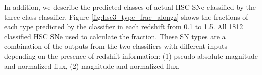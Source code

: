 \documentclass[proof]{pasj01}
\providecommand{\DIFadd}[1]{{\protect\color{blue} \sf #1}} %
\providecommand{\DIFdel}[1]{{\protect\color{red} \scriptsize #1}} %
\providecommand{\DIFaddbegin}{\protect\color{blue}} %
\providecommand{\DIFaddend}{\protect\color{black}} %
\providecommand{\DIFdelbegin}{\protect\color{red}} %
\providecommand{\DIFdelend}{\protect\color{black}} %
\providecommand{\DIFaddbeginFL}{} %
\providecommand{\DIFdelbeginFL}{} %
\providecommand{\DIFdelendFL}{} %
\newcommand{\DIFscaledelfig}{0.5}
\newlength{\DIFdelgraphicswidth} %
\newlength{\DIFdelgraphicsheight} %
\newcommand{\DIFaddincludegraphics}[2][]{{\color{blue}\fbox{\DIFOincludegraphics[#1]{#2}}}} %
\newcommand{\DIFdelincludegraphics}[2][]{%
\sbox{\DIFdelgraphicsbox}{\DIFOincludegraphics[#1]{#2}}%
\settoboxwidth{\DIFdelgraphicswidth}{\DIFdelgraphicsbox} %
\settoboxtotalheight{\DIFdelgraphicsheight}{\DIFdelgraphicsbox} %
\scalebox{\DIFscaledelfig}{%
\parbox[b]{\DIFdelgraphicswidth}{\usebox{\DIFdelgraphicsbox}\\[-\baselineskip] \rule{\DIFdelgraphicswidth}{0em}}\llap{\resizebox{\DIFdelgraphicswidth}{\DIFdelgraphicsheight}{%
\setlength{\unitlength}{\DIFdelgraphicswidth}%
\begin{picture}(1,1)%
\thicklines\linethickness{2pt} %
{\color[rgb]{1,0,0}\put(0,0){\framebox(1,1){}}}%
{\color[rgb]{1,0,0}\put(0,0){\line( 1,1){1}}}%
{\color[rgb]{1,0,0}\put(0,1){\line(1,-1){1}}}%
\end{picture}%
}\hspace*{3pt}}} %
} %
\DeclareRobustCommand{\DIFaddbegin}{\DIFOaddbegin \let\includegraphics\DIFaddincludegraphics} %
\DeclareRobustCommand{\DIFaddend}{\DIFOaddend \let\includegraphics\DIFOincludegraphics} %
\DeclareRobustCommand{\DIFdelbegin}{\DIFOdelbegin \let\includegraphics\DIFdelincludegraphics} %
\DeclareRobustCommand{\DIFdelend}{\DIFOaddend \let\includegraphics\DIFOincludegraphics} %
\DeclareRobustCommand{\DIFaddbeginFL}{\DIFOaddbeginFL \let\includegraphics\DIFaddincludegraphics} %
\DeclareRobustCommand{\DIFdelbeginFL}{\DIFOdelbeginFL \let\includegraphics\DIFdelincludegraphics} %
\DeclareRobustCommand{\DIFdelendFL}{\DIFOaddendFL \let\includegraphics\DIFOincludegraphics} %
\begin{document}
In addition, we describe the predicted classes of actual HSC SNe classified by the three-class classifier.
Figure \ref{fig:hsc3_type_frac_alongz} shows the fractions of each type predicted by the classifier in each redshift from 0.1 to 1.5.
All 1812 \DIFaddbegin \DIFadd{of the }\DIFaddend classified HSC SNe \DIFdelbegin \DIFdel{are }\DIFdelend \DIFaddbegin \DIFadd{were }\DIFaddend used to calculate the fraction.
These SN types are a combination of the outputs from the two classifiers with different inputs depending on the presence of redshift information: (1) pseudo-absolute magnitude and normalized flux, (2) magnitude and normalized flux.

%
%
%
\begin{table}[htbp]
\DIFdelbeginFL %
\DIFdelendFL \DIFaddbeginFL {}
\end{table}
\end{document}
